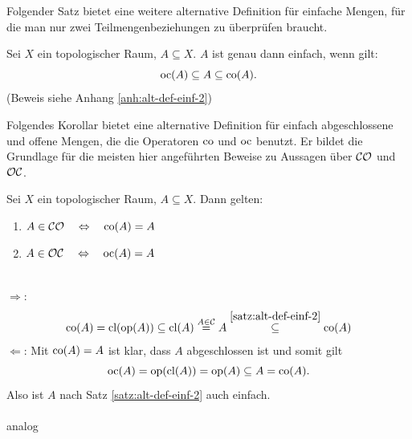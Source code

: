 %
%
    Folgender Satz bietet eine weitere alternative Definition für einfache Mengen, für die man nur zwei Teilmengenbeziehungen zu überprüfen braucht.
    \begin{satz}\label{satz:alt-def-einf-2}
        Sei $X$ ein topologischer Raum, $A \subseteq X$. $A$ ist genau dann einfach, wenn gilt:
        $$ \text{oc}(A) \subseteq A \subseteq \text{co}(A).$$
        (Beweis siehe Anhang \ref{anh:alt-def-einf-2})
    \end{satz}
%
%
    Folgendes Korollar bietet eine alternative Definition für einfach abgeschlossene und offene Mengen, die die Operatoren $\text{co}$ und $\text{oc}$ benutzt. Er bildet die Grundlage für die meisten hier angeführten Beweise zu Aussagen über $\mathcal{CO}$ und $\mathcal{OC}$.
    \begin{kor}\label{kor:co(A)=A-oc(A)=A}
        Sei $X$ ein topologischer Raum, $A \subseteq X$. Dann gelten:
        \begin{enumerate}
            \item\label{satz:co(A)=A} $A \in \mathcal{CO} \quad \Leftrightarrow \quad \text{co}(A) = A$
            \item\label{satz:oc(A)=A} $A \in \mathcal{OC} \quad \Leftrightarrow \quad \text{oc}(A) = A$
        \end{enumerate}
    \end{kor}
    \begin{bew}
        \\ 
        \glqq $\boldsymbol{\Rightarrow}$\grqq:
        \begin{align*}
            \text{co}(A) = \text{cl}(\text{op}(A)) 
            \subseteq \text{cl}(A) 
            \overset{A \in \mathcal{C}}{=} A 
            \overset{\ref{satz:alt-def-einf-2}}{\subseteq} \text{co}(A)
        \end{align*}
        \glqq $\boldsymbol{\Leftarrow}$\grqq: Mit $\text{co}(A) = A$ ist klar, dass $A$ abgeschlossen ist und somit gilt $$\text{oc}(A) = \text{op}(\text{cl}(A)) = \text{op}(A) \subseteq A = \text{co}(A).$$ Also ist $A$ nach Satz \ref{satz:alt-def-einf-2} auch einfach.\\ \ \\
         analog
    \end{bew}
